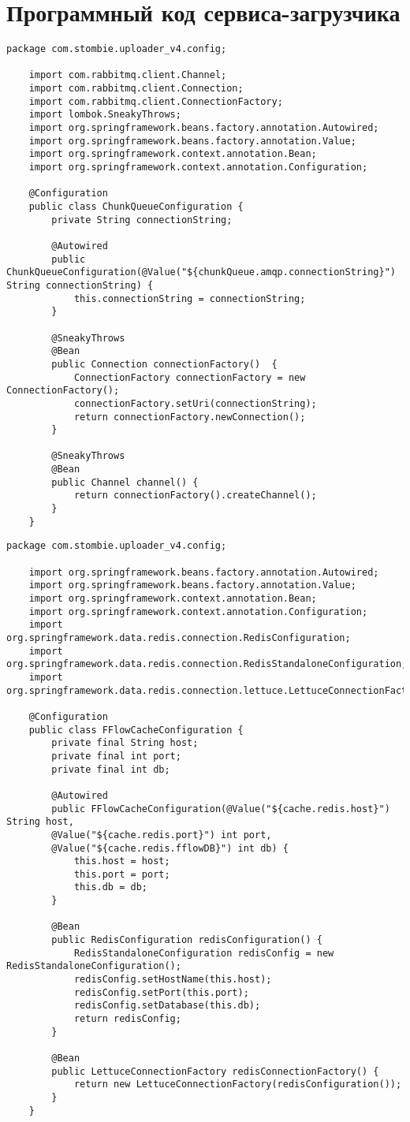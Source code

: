 \chapter{Программный код сервиса-загрузчика}

\begin{lstlisting}[caption={ChunkQueueConfiguration.java}]
	package com.stombie.uploader_v4.config;
	
	import com.rabbitmq.client.Channel;
	import com.rabbitmq.client.Connection;
	import com.rabbitmq.client.ConnectionFactory;
	import lombok.SneakyThrows;
	import org.springframework.beans.factory.annotation.Autowired;
	import org.springframework.beans.factory.annotation.Value;
	import org.springframework.context.annotation.Bean;
	import org.springframework.context.annotation.Configuration;
	
	@Configuration
	public class ChunkQueueConfiguration {
		private String connectionString;
		
		@Autowired
		public ChunkQueueConfiguration(@Value("${chunkQueue.amqp.connectionString}") String connectionString) {
			this.connectionString = connectionString;
		}
		
		@SneakyThrows
		@Bean
		public Connection connectionFactory()  {
			ConnectionFactory connectionFactory = new ConnectionFactory();
			connectionFactory.setUri(connectionString);
			return connectionFactory.newConnection();
		}
		
		@SneakyThrows
		@Bean
		public Channel channel() {
			return connectionFactory().createChannel();
		}
	}
\end{lstlisting}

\begin{lstlisting}[caption={FFlowCacheConfiguration.java}]
	package com.stombie.uploader_v4.config;
	
	import org.springframework.beans.factory.annotation.Autowired;
	import org.springframework.beans.factory.annotation.Value;
	import org.springframework.context.annotation.Bean;
	import org.springframework.context.annotation.Configuration;
	import org.springframework.data.redis.connection.RedisConfiguration;
	import org.springframework.data.redis.connection.RedisStandaloneConfiguration;
	import org.springframework.data.redis.connection.lettuce.LettuceConnectionFactory;
	
	@Configuration
	public class FFlowCacheConfiguration {
		private final String host;
		private final int port;
		private final int db;
		
		@Autowired
		public FFlowCacheConfiguration(@Value("${cache.redis.host}") String host,
		@Value("${cache.redis.port}") int port,
		@Value("${cache.redis.fflowDB}") int db) {
			this.host = host;
			this.port = port;
			this.db = db;
		}
		
		@Bean
		public RedisConfiguration redisConfiguration() {
			RedisStandaloneConfiguration redisConfig = new RedisStandaloneConfiguration();
			redisConfig.setHostName(this.host);
			redisConfig.setPort(this.port);
			redisConfig.setDatabase(this.db);
			return redisConfig;
		}
		
		@Bean
		public LettuceConnectionFactory redisConnectionFactory() {
			return new LettuceConnectionFactory(redisConfiguration());
		}
	}
\end{lstlisting}

